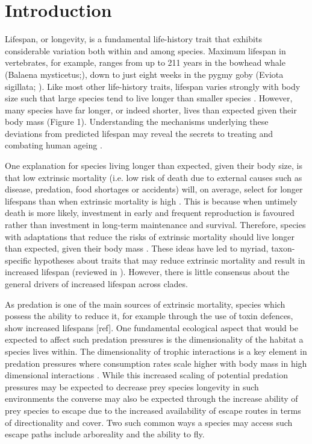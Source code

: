 \section{Introduction}

Lifespan, or longevity, is a fundamental life-history trait that exhibits considerable variation both within and among species. Maximum lifespan in vertebrates, for example, ranges from up to 211 years in the bowhead whale (Balaena mysticetus;\citep{de2009database}), down to just eight weeks in the pygmy goby (Eviota sigillata; \citep{depczynski2005shortest}). Like most other life-history traits, lifespan varies strongly with body size such that large species tend to live longer than smaller species \citep{lindstedt1981body,promislow1993size,de2007analysis,ricklefs2010life}. However, many species have far longer, or indeed shorter, lives than expected given their body mass (Figure 1). Understanding the mechanisms underlying these deviations from predicted lifespan may reveal the secrets to treating and combating human ageing \citep{ricklefs2010insights,zhang2013comparative}. 

One explanation for species living longer than expected, given their body size, is that low extrinsic mortality (i.e. low risk of death due to external causes such as disease, predation, food shortages  or accidents) will, on average, select for longer lifespans than when extrinsic mortality is high \citep{stearns1992evolution,Williams1957}. This is because when untimely death is more likely, investment in early and frequent reproduction is favoured rather than investment in long-term maintenance and survival. Therefore, species with adaptations that reduce the risks of extrinsic mortality should live longer than expected, given their body mass \citep{partridge1993optimality}. These ideas have led to myriad, taxon-specific hypotheses about traits that may reduce extrinsic mortality and result in increased lifespan (reviewed in \cite{ricklefs2010insights}). However, there is little consensus about the general drivers of increased lifespan across clades.

As predation is one of the main sources of extrinsic mortality, species which possess the ability to reduce it, for example through the use of toxin defences, show increased lifespans [ref]. One fundamental ecological aspect that would be expected to affect such predation pressures is the dimensionality of the habitat a species lives within. The dimensionality of trophic interactions is a key element in predation pressures where consumption rates scale higher with body mass in high dimensional interactions \citep{pawar2012dimensionality}. While this increased scaling of potential predation pressures may be expected to decrease prey species longevity in such environments the converse may also be expected through the increase ability of prey species to escape due to the increased availability of escape routes in terms of directionality and cover. Two such common ways a species may access such escape paths include arboreality and the ability to fly.

